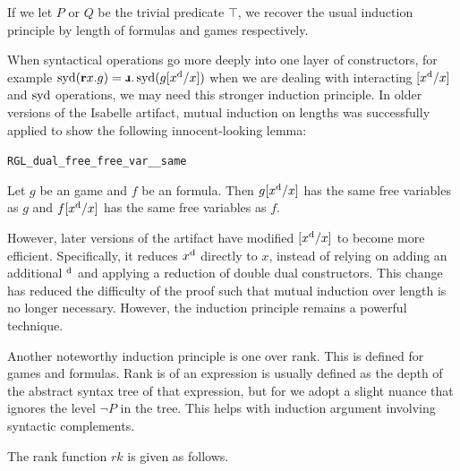If we let $P$ or $Q$ be the trivial predicate $\top$, we recover the usual induction principle by length of formulas and games respectively.

When syntactical operations go more deeply into one layer of constructors, for example $\syd (\Rec x. g) = \DRec. \syd (g[\Dual{x}/x])$ when we are dealing with interacting $[x^\text{d}/x]$ and $\operatorname{syd}$ operations, we may need this stronger induction principle. In older versions of the Isabelle artifact, mutual induction on lengths was successfully applied to show the following innocent-looking lemma:

\begin{blemma}
\texttt{RGL\_dual\_free\_free\_var\_\_same}

Let $g$ be an \RGL{} game and $f$ be an \RGL{} formula. Then $g[x^\text{d}/x]$ has the same free variables as $g$ and $f[x^\text{d}/x]$ has the same free variables as $f$.
\end{blemma}

However, later versions of the artifact have modified $[x^\text{d}/x]$ to become more efficient. Specifically, it reduces $x^\text{d}$ directly to $x$, instead of relying on adding an additional $^\text{d}$ and applying a reduction of double dual constructors. This change has reduced the difficulty of the proof such that mutual induction over length is no longer necessary. However, the induction principle remains a powerful technique.

Another noteworthy induction principle is one over rank. This is defined for \GLs{} games and formulas. Rank is of an expression is usually defined as the depth of the abstract syntax tree of that expression, but for \GLs{} we adopt a slight nuance that ignores the level $\neg P$ in the tree. This helps with induction argument involving syntactic complements.

The rank function $rk$ is given as follows.

